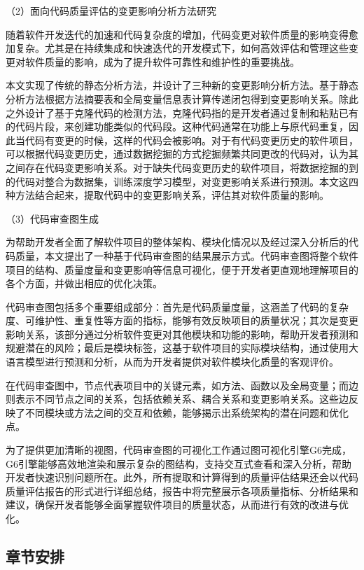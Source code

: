 （2）面向代码质量评估的变更影响分析方法研究

随着软件开发迭代的加速和代码复杂度的增加，代码变更对软件质量的影响变得愈加复杂。尤其是在持续集成和快速迭代的开发模式下，如何高效评估和管理这些变更对软件质量的影响，成为了提升软件可靠性和维护性的重要挑战。

本文实现了传统的静态分析方法，并设计了三种新的变更影响分析方法。基于静态分析方法根据方法摘要表和全局变量信息表计算传递闭包得到变更影响关系。除此之外设计了基于克隆代码的检测方法，克隆代码指的是开发者通过复制和粘贴已有的代码片段，来创建功能类似的代码段。这种代码通常在功能上与原代码重复，因此当代码有变更的时候，这样的代码会被影响。对于有代码变更历史的软件项目，可以根据代码变更历史，通过数据挖掘的方式挖掘频繁共同更改的代码对，认为其之间存在代码变更影响关系。对于缺失代码变更历史的软件项目，将数据挖掘的到的代码对整合为数据集，训练深度学习模型，对变更影响关系进行预测。本文这四种方法结合起来，提取代码中的变更影响关系，评估其对软件质量的影响。



（3）代码审查图生成

为帮助开发者全面了解软件项目的整体架构、模块化情况以及经过深入分析后的代码质量，本文提出了一种基于代码审查图的结果展示方式。代码审查图将整个软件项目的结构、质量度量和变更影响等信息可视化，便于开发者更直观地理解项目的各个方面，并做出相应的优化决策。

代码审查图包括多个重要组成部分：首先是代码质量度量，这涵盖了代码的复杂度、可维护性、重复性等方面的指标，能够有效反映项目的质量状况；其次是变更影响关系，该部分通过分析软件变更对其他模块和功能的影响，帮助开发者预测和规避潜在的风险；最后是模块标签，这基于软件项目的实际模块结构，通过使用大语言模型进行预测和分析，从而为开发者提供对软件模块化质量的客观评价。

在代码审查图中，节点代表项目中的关键元素，如方法、函数以及全局变量；而边则表示不同节点之间的关系，包括依赖关系、耦合关系和变更影响关系。这些边反映了不同模块或方法之间的交互和依赖，能够揭示出系统架构的潜在问题和优化点。

为了提供更加清晰的视图，代码审查图的可视化工作通过图可视化引擎G6完成，G6引擎能够高效地渲染和展示复杂的图结构，支持交互式查看和深入分析，帮助开发者快速识别问题所在。此外，所有提取和计算得到的质量评估结果还会以代码质量评估报告的形式进行详细总结，报告中将完整展示各项质量指标、分析结果和建议，确保开发者能够全面掌握软件项目的质量状态，从而进行有效的改进与优化。

\subsection{章节安排}

